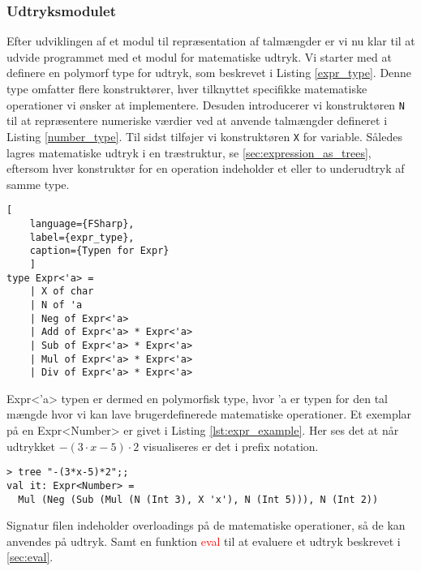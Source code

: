 \subsubsection{Udtryksmodulet}\label{sec:expression_module}
Efter udviklingen af et modul til repræsentation af talmængder er vi nu klar til at udvide programmet med et modul for matematiske udtryk. Vi starter med at definere en polymorf type for udtryk, som beskrevet i Listing \ref{expr_type}. Denne type omfatter flere konstruktører, hver tilknyttet specifikke matematiske operationer vi ønsker at implementere. Desuden introducerer vi konstruktøren \texttt{N} til at repræsentere numeriske værdier ved at anvende talmængder defineret i Listing \ref{number_type}. Til sidst tilføjer vi konstruktøren \texttt{X} for variable. Således lagres matematiske udtryk i en træstruktur, se \ref{sec:expression_as_trees}, eftersom hver konstruktør for en operation indeholder et eller to underudtryk af samme type.


\begin{lstlisting}[
    language={FSharp}, 
    label={expr_type}, 
    caption={Typen for Expr}
    ]
type Expr<'a> = 
    | X of char
    | N of 'a
    | Neg of Expr<'a>
    | Add of Expr<'a> * Expr<'a>
    | Sub of Expr<'a> * Expr<'a>
    | Mul of Expr<'a> * Expr<'a>
    | Div of Expr<'a> * Expr<'a>
\end{lstlisting}

Expr\textless'a\textgreater{}  typen er dermed en polymorfisk type, hvor 'a er typen for den tal mængde hvor vi kan lave brugerdefinerede matematiske operationer. Et exemplar på en Expr\textless Number\textgreater{}  er givet i Listing \ref{lst:expr_example}. Her ses det at når udtrykket $-(3 \cdot x - 5) \cdot 2$ visualiseres er det i prefix notation.

\begin{lstlisting}[style=output, label={lst:expr_example}, caption={$-(3 \cdot x - 5) \cdot 2$ som et udtryks træ. Funktionen tree bliver beskrevet i \ref{sec:expression_generation}.}]
> tree "-(3*x-5)*2";;
val it: Expr<Number> = 
  Mul (Neg (Sub (Mul (N (Int 3), X 'x'), N (Int 5))), N (Int 2))
\end{lstlisting}

Signatur filen indeholder overloadings på de matematiske operationer, så de kan anvendes på udtryk. Samt en funktion \textcolor{red}{eval} til at evaluere et udtryk beskrevet i \ref{sec:eval}. 




